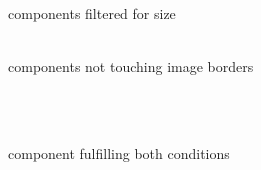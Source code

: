 \documentclass[12pt,a4paper,oneside,openright]{book}
\begin{document}
\begin{CJK}{UTF8}{}
\begin{figure}[htbp]
\begin{center}
\begin{minipage}[t]{.32\textwidth}
\begin{center}
        components filtered for size
      \end{center}
    \end{minipage}
    \begin{minipage}[t]{.32\textwidth}
      \begin{center}
        \\
        components not touching image borders
      \end{center}
    \end{minipage}\medskip\\
    \begin{minipage}[t]{.32\textwidth}
      \begin{center}
        \\
        component fulfilling both conditions
      \end{center}
    \end{minipage}
    \begin{minipage}[t]{.32\textwidth}
      \begin{center}
        \\

\end{center}
\end{minipage}
\end{center}
\end{figure}
\end{CJK}
\end{document}
